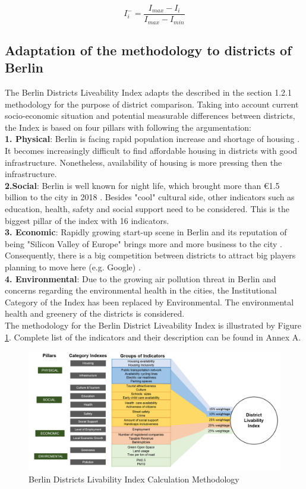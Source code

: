  \begin{equation}
I_i^- = \frac{I_{max}- I_i}{I_{max}- I_{min}}
\label{eq:2}
\end{equation}

\subsection{Adaptation of the methodology to districts of Berlin}
 
The Berlin Districts Liveability Index adapts the described in the section 1.2.1 methodology for the purpose of district comparison. Taking into account current socio-economic situation and potential measurable differences between districts, the Index is based on four pillars with following the argumentation:
\\ 
\textbf{1. Physical}: Berlin is facing rapid population increase and shortage of housing \citep{Schultheis.2019}. It becomes increasingly difficult to find affordable housing in districts with good infrastructure. Nonetheless, availability of housing is more pressing then the infrastructure. 
\\ 
\textbf{2.Social}: Berlin is well known for night life, which brought more than €1.5 billion to the city in 2018 \citep{Local.2019}. Besides "cool" cultural side, other indicators such as education, health, safety and social support need to be considered. This is the biggest pillar of the index with 16 indicators.
\\
\textbf{3. Economic}: Rapidly growing start-up scene in Berlin and its reputation of being "Silicon Valley of Europe" brings more and more business to the city \citep{cooke2015skill}. Consequently, there is a big competition between districts to attract big players planning to move here (e.g. Google) \citep{Kuhn.2019}. 
\\
\textbf{4. Environmental}: Due to the growing air pollution threat in Berlin \citep{tagesspiegel.2019} and concerns regarding the environmental health in the cities, the Institutional Category of the Index has been replaced by Environmental. The environmental health and greenery of the districts is considered.\\
The methodology for the Berlin District Liveability Index is illustrated by Figure \ref{fig:meth}. Complete list of the indicators and their description can be found in Annex A. 

\begin{figure}[h]

\centering
\includegraphics[scale=0.35]{images/Methodology.png}
\caption{Berlin Districts Livability Index Calculation Methodology }
\label{fig:meth}
\end{figure}


